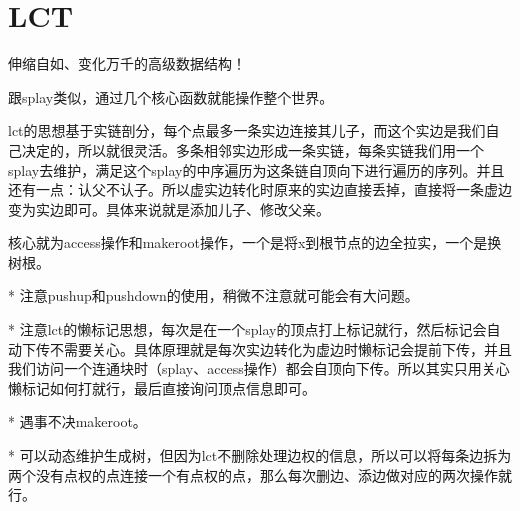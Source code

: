 \documentclass[a4paper,11pt,twoside,fontset = fandol,UTF8]{ctexbook} %
\begin{document}
	\section{LCT}
	伸缩自如、变化万千的高级数据结构！
	
	跟splay类似，通过几个核心函数就能操作整个世界。
	
	lct的思想基于实链剖分，每个点最多一条实边连接其儿子，而这个实边是我们自己决定的，所以就很灵活。多条相邻实边形成一条实链，每条实链我们用一个splay去维护，满足这个splay的中序遍历为这条链自顶向下进行遍历的序列。并且还有一点：认父不认子。所以虚实边转化时原来的实边直接丢掉，直接将一条虚边变为实边即可。具体来说就是添加儿子、修改父亲。
	
	核心就为access操作和makeroot操作，一个是将x到根节点的边全拉实，一个是换树根。
	
	* 注意pushup和pushdown的使用，稍微不注意就可能会有大问题。
	
	* 注意lct的懒标记思想，每次是在一个splay的顶点打上标记就行，然后标记会自动下传不需要关心。具体原理就是每次实边转化为虚边时懒标记会提前下传，并且我们访问一个连通块时（splay、access操作）都会自顶向下传。所以其实只用关心懒标记如何打就行，最后直接询问顶点信息即可。
	
	* 遇事不决makeroot。
	
	* 可以动态维护生成树，但因为lct不删除处理边权的信息，所以可以将每条边拆为两个没有点权的点连接一个有点权的点，那么每次删边、添边做对应的两次操作就行。
	
\end{document}
